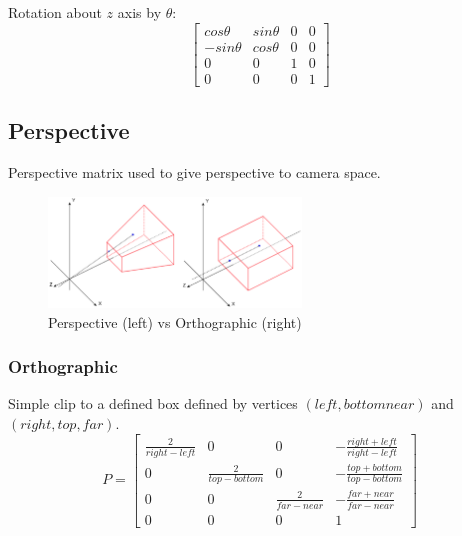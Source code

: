 \documentclass[a4paper]{article}
\begin{document}
Rotation about $z$ axis by $\theta$:
\[
  \left [
    \begin{array}{cccc}
      cos\theta   & sin\theta & 0 & 0 \\
      -sin\theta  & cos\theta & 0 & 0 \\
      0           & 0         & 1 & 0 \\
      0           & 0         & 0 & 1
    \end{array}
  \right ]
\]

\subsection{Perspective}

Perspective matrix used to give perspective to camera space.

\begin{figure}[h!]
  \centering
  \includegraphics[width=0.6\textwidth]{graphics/perspective-orthographic.eps}
  \caption{Perspective (left) vs Orthographic (right)}
  \label{fig:perspective-orthographic}
\end{figure}
\FloatBarrier

\subsubsection{Orthographic}

Simple clip to a defined box defined by vertices $(left, bottom near)$ and
$(right, top, far)$.
\[
  P =
  \left [
    \begin{array}{cccc}
      \frac{2}{right - left}  & 0                       & 0                     & -\frac{right + left}{right - left} \\
      0                       & \frac{2}{top - bottom}  & 0                     & -\frac{top + bottom}{top - bottom} \\
      0                       & 0                       & \frac{2}{far - near}  & -\frac{far + near}{far - near} \\
      0                       & 0                       & 0                     & 1
    \end{array}
  \right ]
\]
\end{document}
